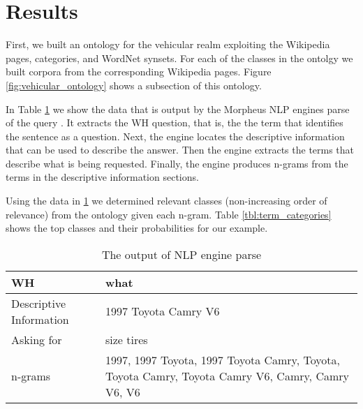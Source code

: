 \section{Results}
\label{sec:results}


First, we built an ontology for the vehicular realm exploiting the Wikipedia pages, categories, and WordNet synsets. For each of the classes in the ontolgy we built corpora from the corresponding Wikipedia pages. Figure \ref{fig:vehicular_ontology} shows a subsection of this ontology.



In Table \ref{tbl:nlp_engine_parse} we show the data that is output by the Morpheus NLP engines parse of the query .  It extracts the WH question, that is, the the term that identifies the sentence as a question.  Next, the engine locates the descriptive information that can be used to describe the answer. Then the engine extracts the terms that describe what is being requested. Finally, the engine produces n-grams from the terms in the descriptive information sections.

Using the data in \ref{tbl:nlp_engine_parse} we determined relevant classes (non-increasing order of relevance) from the ontology given each n-gram. Table \ref{tbl:term_categories} shows the top classes and their probabilities for our example.


\begin{table}[h]\footnotesize
	\begin{tabular}{|l|p{4.2cm}|}
		\hline 
		WH & what \\
		\hline 
		Descriptive Information & 1997 Toyota Camry V6 \\
		\hline 
		Asking for & size tires \\
		\hline 
		n-grams & 1997, 1997 Toyota, 1997 Toyota Camry, Toyota, Toyota Camry, Toyota Camry V6, Camry, Camry V6, V6 \\
		\hline
	\end{tabular}
	\caption{The output of NLP engine parse}
	\label{tbl:nlp_engine_parse} 
\end{table}

